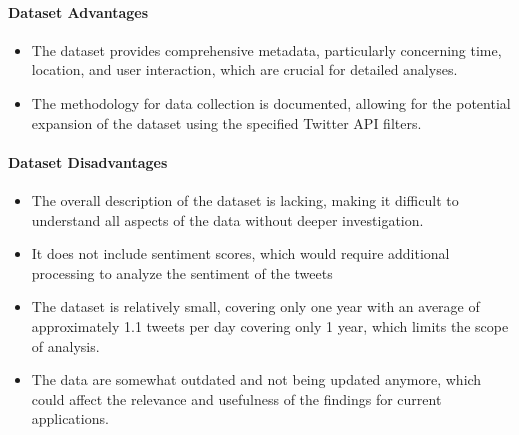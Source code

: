 \paragraph{Dataset Advantages}
\begin{itemize}
    \item The dataset provides comprehensive metadata, particularly concerning time, location, and user interaction, which are crucial for detailed analyses.
    \item The methodology for data collection is documented, allowing for the potential expansion of the dataset using the specified Twitter API filters.
\end{itemize}

\paragraph{Dataset Disadvantages}
\begin{itemize}
    \item The overall description of the dataset is lacking, making it difficult to understand all aspects of the data without deeper investigation.
    \item It does not include sentiment scores, which would require additional processing to analyze the sentiment of the tweets
    \item The dataset is relatively small, covering only one year with an average of approximately 1.1 tweets per day covering only 1 year, which limits the scope of analysis.
    \item The data are somewhat outdated and not being updated anymore, which could affect the relevance and usefulness of the findings for current applications.
\end{itemize}

